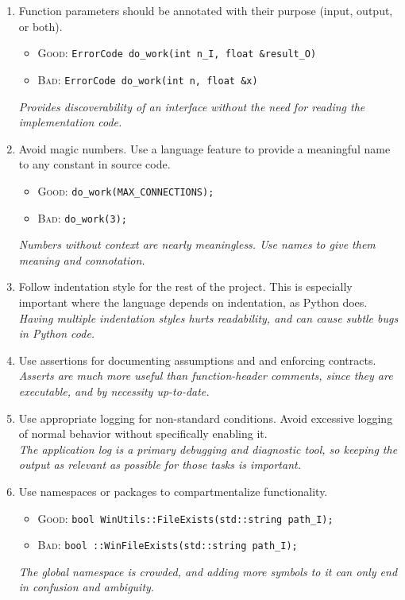 \documentclass[11pt]{article}
\begin{document}
\begin{enumerate}
\item Function parameters should be annotated with their purpose (input, output, or both).
  \begin{itemize}
    \item \textsc{Good:} \texttt{ErrorCode do\_work(int n\_I, float \&result\_O)} 
    \item \textsc{Bad:} \texttt{ErrorCode do\_work(int n, float \&x)}
  \end{itemize}
  {\it Provides discoverability of an interface without the need for reading the implementation
    code.}

\item Avoid magic numbers.  Use a language feature to provide a meaningful name to any constant in
  source code.
  \begin{itemize}
  \item \textsc{Good:} \texttt{do\_work(MAX\_CONNECTIONS);}
  \item \textsc{Bad:} \texttt{do\_work(3);}
  \end{itemize}
  {\it Numbers without context are nearly meaningless.  Use names to give them meaning and
    connotation. }

\item Follow indentation style for the rest of the project.  This is especially important where the
  language depends on indentation, as Python does.
  \\ {\it Having multiple indentation styles hurts readability, and can cause subtle bugs in Python
    code. }

\item Use assertions for documenting assumptions and and enforcing contracts.
  \\ {\it Asserts are much more useful than function-header comments, since they are executable, and
    by necessity up-to-date. }

\item Use appropriate logging for non-standard conditions.  Avoid excessive logging of normal
  behavior without specifically enabling it.
  \\ {\it The application log is a primary debugging and diagnostic tool, so keeping the output as
    relevant as possible for those tasks is important. }

\item Use namespaces or packages to compartmentalize functionality.
  \begin{itemize}
  \item \textsc{Good:} \texttt{bool WinUtils::FileExists(std::string path\_I);}
  \item \textsc{Bad:} \texttt{bool ::WinFileExists(std::string path\_I);}
  \end{itemize}
  {\it The global namespace is crowded, and adding more symbols to it can only end in confusion and
    ambiguity.   }


\end{enumerate}
\end{document}
